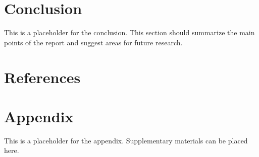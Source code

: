 \documentclass[12pt, letterpaper]{article}
\begin{document}
\section{Conclusion}
This is a placeholder for the conclusion. This section should summarize the main points of the report and suggest areas for future research.


\section*{References}
\printbibliography

\appendix
\section{Appendix}
This is a placeholder for the appendix. Supplementary materials can be placed here.
\end{document}
